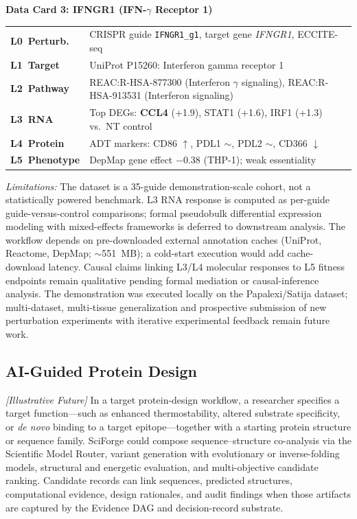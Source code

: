 \documentclass[sn-basic,Numbered,pdflatex]{sn-jnl}
\begin{document}
\vspace{6pt}

\noindent\colorbox{gray!20}{\textbf{\small Data Card 3: IFNGR1 (IFN-$\gamma$ Receptor 1)}}
\vspace{3pt}

\noindent\begin{tabular}{@{}p{2.5cm} p{13.2cm}@{}}
\cellcolor{blue!15} \textbf{L0~Perturb.} & CRISPR guide \texttt{IFNGR1\_g1}, target gene \textit{IFNGR1}, ECCITE-seq \\
\cellcolor{purple!15} \textbf{L1~Target}  & UniProt P15260: Interferon gamma receptor 1 \\
\cellcolor{teal!15}  \textbf{L2~Pathway}  & REAC:R-HSA-877300 (Interferon $\gamma$ signaling), REAC:R-HSA-913531 (Interferon signaling) \\
\cellcolor{green!15} \textbf{L3~RNA}      & Top DEGs: \textbf{CCL4} (+1.9), STAT1 (+1.6), IRF1 (+1.3) vs.\ NT control \\
\cellcolor{orange!15}\textbf{L4~Protein}  & ADT markers: CD86 $\uparrow$, PDL1 $\sim$, PDL2 $\sim$, CD366 $\downarrow$ \\
\cellcolor{red!15}   \textbf{L5~Phenotype}& DepMap gene effect $-0.38$ (THP-1); weak essentiality \\
\end{tabular}
\textit{Limitations:} The dataset is a 35-guide demonstration-scale cohort, not a statistically powered benchmark. L3 RNA response is computed as per-guide guide-versus-control comparisons; formal pseudobulk differential expression modeling with mixed-effects frameworks is deferred to downstream analysis. The workflow depends on pre-downloaded external annotation caches (UniProt, Reactome, DepMap; $\sim$551~MB); a cold-start execution would add cache-download latency. Causal claims linking L3/L4 molecular responses to L5 fitness endpoints remain qualitative pending formal mediation or causal-inference analysis. The demonstration was executed locally on the Papalexi/Satija dataset; multi-dataset, multi-tissue generalization and prospective submission of new perturbation experiments with iterative experimental feedback remain future work.

\FloatBarrier
\subsection{AI-Guided Protein Design}

\textit{[Illustrative Future]} In a target protein-design workflow, a researcher specifies a target function---such as enhanced thermostability, altered substrate specificity, or \emph{de novo} binding to a target epitope---together with a starting protein structure or sequence family. SciForge could compose sequence--structure co-analysis via the Scientific Model Router, variant generation with evolutionary or inverse-folding models, structural and energetic evaluation, and multi-objective candidate ranking. Candidate records can link sequences, predicted structures, computational evidence, design rationales, and audit findings when those artifacts are captured by the Evidence DAG and decision-record substrate.
\end{document}
